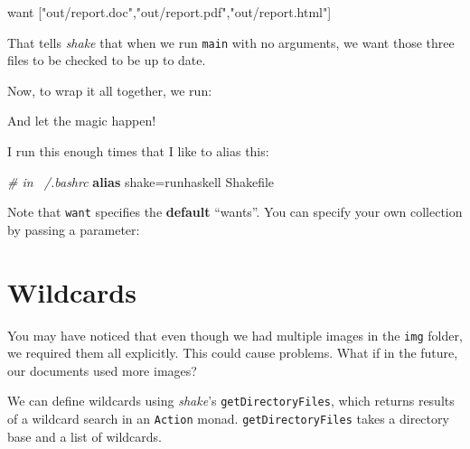 \documentclass[]{article}
\newenvironment{Shaded}{}{}
\newcommand{\KeywordTok}[1]{\textcolor[rgb]{0.00,0.44,0.13}{\textbf{{#1}}}}
\newcommand{\StringTok}[1]{\textcolor[rgb]{0.25,0.44,0.63}{{#1}}}
\newcommand{\CommentTok}[1]{\textcolor[rgb]{0.38,0.63,0.69}{\textit{{#1}}}}
\newcommand{\NormalTok}[1]{{#1}}
\begin{document}
\begin{Shaded}
\begin{Highlighting}[]
\NormalTok{want [}\StringTok{"out/report.doc"}\NormalTok{,}\StringTok{"out/report.pdf"}\NormalTok{,}\StringTok{"out/report.html"}\NormalTok{]}
\end{Highlighting}
\end{Shaded}

That tells \emph{shake} that when we run \texttt{main} with no arguments, we want those three files
to be checked to be up to date.

Now, to wrap it all together, we run:

\begin{Shaded}
\end{Shaded}

And let the magic happen!

I run this enough times that I like to alias this:

\begin{Shaded}
\begin{Highlighting}[]
\CommentTok{# in ~/.bashrc}
\KeywordTok{alias} \NormalTok{shake=runhaskell Shakefile}
\end{Highlighting}
\end{Shaded}

Note that \texttt{want} specifies the \textbf{default} ``wants''. You can specify your own
collection by passing a parameter:

\begin{Shaded}
\end{Shaded}

\section{Wildcards}\label{wildcards}

You may have noticed that even though we had multiple images in the \texttt{img} folder, we required
them all explicitly. This could cause problems. What if in the future, our documents used more
images?

We can define wildcards using \emph{shake}'s \texttt{getDirectoryFiles}, which returns results of a
wildcard search in an \texttt{Action} monad. \texttt{getDirectoryFiles} takes a directory base and a
list of wildcards.
\end{document}
